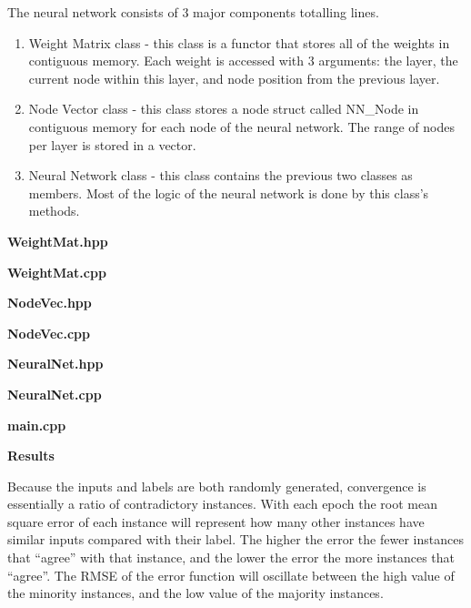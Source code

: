 \documentclass[14pt]{article}
\begin{document}
\begin{flushleft}
The neural network consists of 3 major components totalling lines.
\begin{enumerate}
	\item Weight Matrix class - this class is a functor that stores all of the weights in contiguous memory.
		Each weight is accessed with 3 arguments:
		the layer, the current node within this layer, and node position from the previous layer.
	\item Node Vector class - this class stores a node struct called NN\_Node in contiguous memory
		for each node of the neural network. The range of nodes per layer is stored in a vector.
	\item Neural Network class - this class contains the previous two classes as members.
		Most of the logic of the neural network is done by this class's methods.
\end{enumerate}


	\textbf{WeightMat.hpp}

	\textbf{WeightMat.cpp}


	\textbf{NodeVec.hpp}

	\textbf{NodeVec.cpp}


	\textbf{NeuralNet.hpp}

	\textbf{NeuralNet.cpp}


	\textbf{main.cpp}

\textbf{Results}

Because the inputs and labels are both randomly generated,
convergence is essentially a ratio of contradictory instances.
With each epoch the root mean square error of each instance will represent
how many other instances have similar inputs compared with their label.
The higher the error the fewer instances that ``agree'' with that instance,
and the lower the error the more instances that ``agree''.
The RMSE of the error function will oscillate between the high value of the minority instances,
and the low value of the majority instances.


\end{flushleft}
\end{document}
